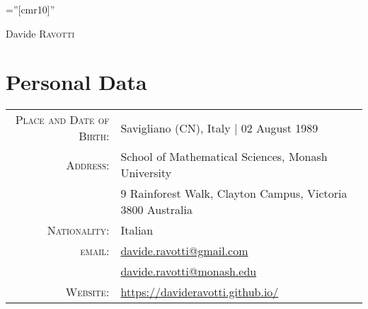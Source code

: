 \documentclass[a4paper,10pt]{article}
\begin{document}

\pagestyle{empty} %

\font\fb=''[cmr10]'' %


\par{\centering
		{\Huge Davide \textsc{Ravotti}
	}\bigskip\par}



\section{Personal Data}

\begin{tabular}{rl}
    \textsc{Place and Date of Birth:} & Savigliano (CN), Italy | 02 August 1989 \\
    \textsc{Address:}  & School of Mathematical Sciences, Monash University \\
 & 9 Rainforest Walk, Clayton Campus, Victoria 3800 Australia \\
    \textsc{Nationality:}  & Italian \\
    \textsc{email:}  & \href{mailto:davide.ravotti@gmail.com}{davide.ravotti@gmail.com} \\
& \href{mailto:davide.ravotti@monash.edu}{davide.ravotti@monash.edu} \\
    \textsc{Website:} & \href{https://davideravotti.github.io/}{\url{https://davideravotti.github.io/}}
\end{tabular}


\end{document}
